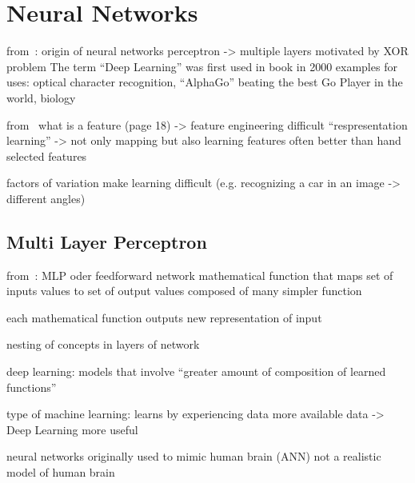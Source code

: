%

%





\section{Neural Networks}\label{sec:dnn}

from~\autocite{sonnet2022NeuralBoook}:
origin of neural networks
perceptron -> multiple layers motivated by XOR problem
The term \enquote{Deep Learning} was first used in book in 2000
examples for uses: optical character recognition, \enquote{AlphaGo} beating the best Go Player in the world, biology


from~\autocite{Goodfellow-et-al-2016}
what is a feature (page 18) -> feature engineering difficult
\enquote{respresentation learning} -> not only mapping but also learning features
often better than hand selected features

factors of variation make learning difficult (e.g. recognizing a car in an image -> different angles)

\subsection{Multi Layer Perceptron}\label{subsec:multi-layer-perceptron}
from~\autocite{Goodfellow-et-al-2016}:
MLP oder feedforward network
mathematical function that maps set of inputs values to set of output values
composed of many simpler function

each mathematical function outputs new representation of input

nesting of concepts in layers of network

deep learning: models that involve \enquote{greater amount of composition of learned functions}

type of machine learning: learns by experiencing data
more available data -> Deep Learning more useful

neural networks originally used to mimic human brain (ANN)
not a realistic model of human brain

